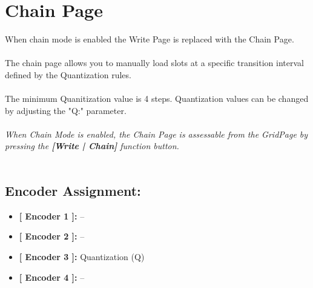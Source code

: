 \chapter{Chain Page}
When chain mode is enabled the Write Page is replaced with the Chain Page.\\
\\
The chain page allows you to manually load slots at a specific transition interval defined by the Quantization rules.\\
\\
The minimum Quanitization value is 4 steps. Quantization values can be changed by adjusting the "Q:" parameter.
\\\\
\textit{When Chain Mode is enabled, the Chain Page is assessable from the GridPage by pressing the  \textbf{[Write | Chain]} function button.}
\\\\
\section{Encoder Assignment:}

\begin{itemize}
	\item \textbf{[ Encoder 1 ]: } --
	\item \textbf{[ Encoder 2 ]: } --
	\item \textbf{[ Encoder 3 ]: } Quantization (Q)
	\item \textbf{[ Encoder 4 ]: }--
\end{itemize}

